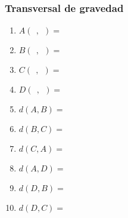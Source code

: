 \documentclass[12pt,spanish,x11names]{beamer}
\begin{document}
\begin{frame}
  \frametitle{Transversal de gravedad}
  \begin{minipage}[t]{.6\linewidth}
     \begin{figure}[h]
      \centering
    \end{figure}
  \end{minipage}
  \begin{minipage}[t]{.3\linewidth}
    \begin{enumerate}
    \item $A(\ \ ,\ \ )=$
    \item $B(\ \ ,\ \ )=$
    \item $C(\ \ ,\ \ )=$
    \item $D(\ \ ,\ \ )=$
    \item $d(A,B)=$
    \item $d(B,C)=$
    \item $d(C,A)=$
    \item $d(A,D)=$
    \item $d(D,B)=$
    \item $d(D,C)=$
    \end{enumerate}
  \end{minipage}
\end{frame}
\end{document}
